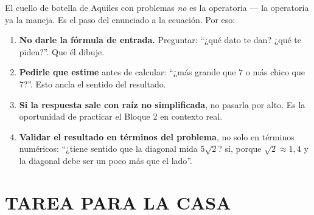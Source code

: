 \documentclass[11pt,a4paper]{article}
\begin{document}
\begin{tcolorbox}[guia-tutor, title={\color{tutormorado} CÓMO ACOMPAÑAR LA RESOLUCIÓN DE PROBLEMAS}]
El cuello de botella de Aquiles con problemas \emph{no} es la operatoria --- la operatoria ya la maneja. Es el paso del enunciado a la ecuación. Por eso:

\begin{enumerate}[nosep]
  \item \textbf{No darle la fórmula de entrada.} Preguntar: ``¿qué dato te dan? ¿qué te piden?''. Que él dibuje.
  \item \textbf{Pedirle que estime} antes de calcular: ``¿más grande que $7$ o más chico que $7$?''. Esto ancla el sentido del resultado.
  \item \textbf{Si la respuesta sale con raíz no simplificada}, no pasarla por alto. Es la oportunidad de practicar el Bloque 2 en contexto real.
  \item \textbf{Validar el resultado en términos del problema}, no solo en términos numéricos: ``¿tiene sentido que la diagonal mida $5\sqrt{2}$? sí, porque $\sqrt{2} \approx 1{,}4$ y la diagonal debe ser un poco más que el lado''.
\end{enumerate}
\end{tcolorbox}

\newpage

\section*{TAREA PARA LA CASA}
\end{document}
